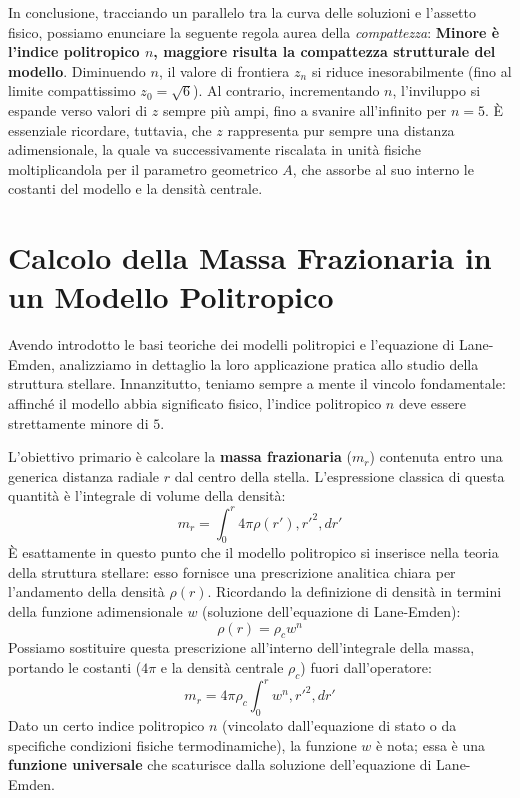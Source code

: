 In conclusione, tracciando un parallelo tra la curva delle soluzioni e l'assetto fisico, possiamo enunciare la seguente regola aurea della \textit{compattezza}:
\textbf{Minore è l'indice politropico $n$, maggiore risulta la compattezza strutturale del modello}.
Diminuendo $n$, il valore di frontiera $z_n$ si riduce inesorabilmente (fino al limite compattissimo $z_0 = \sqrt{6}$). Al contrario, incrementando $n$, l'inviluppo si espande verso valori di $z$ sempre più ampi, fino a svanire all'infinito per $n=5$. È essenziale ricordare, tuttavia, che $z$ rappresenta pur sempre una distanza adimensionale, la quale va successivamente riscalata in unità fisiche moltiplicandola per il parametro geometrico $A$, che assorbe al suo interno le costanti del modello e la densità centrale.

\section{Calcolo della Massa Frazionaria in un Modello Politropico}

Avendo introdotto le basi teoriche dei modelli politropici e l'equazione di Lane-Emden, analizziamo in dettaglio la loro applicazione pratica allo studio della struttura stellare.
Innanzitutto, teniamo sempre a mente il vincolo fondamentale: affinché il modello abbia significato fisico, l'indice politropico $n$ deve essere strettamente minore di $5$.

L'obiettivo primario è calcolare la \textbf{massa frazionaria} ($m_r$) contenuta entro una generica distanza radiale $r$ dal centro della stella. L'espressione classica di questa quantità è l'integrale di volume della densità:
\begin{equation}
m_r = \int_0^r 4\pi \rho (r') , r'^2 , dr'
\end{equation}
È esattamente in questo punto che il modello politropico si inserisce nella teoria della struttura stellare: esso fornisce una prescrizione analitica chiara per l'andamento della densità $\rho(r)$.
Ricordando la definizione di densità in termini della funzione adimensionale $w$ (soluzione dell'equazione di Lane-Emden):
\begin{equation}
\rho(r) = \rho_c w^n
\end{equation}
Possiamo sostituire questa prescrizione all'interno dell'integrale della massa, portando le costanti ($4\pi$ e la densità centrale $\rho_c$) fuori dall'operatore:
\begin{equation}
m_r = 4\pi \rho_c \int_0^r w^n , r'^2 , dr'
\end{equation}
Dato un certo indice politropico $n$ (vincolato dall'equazione di stato o da specifiche condizioni fisiche termodinamiche), la funzione $w$ è nota; essa è una \textbf{funzione universale} che scaturisce dalla soluzione dell'equazione di Lane-Emden.

